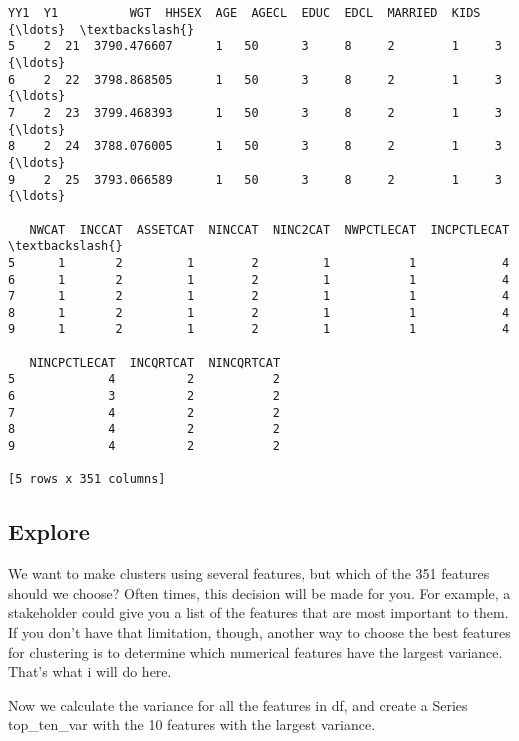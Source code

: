 \documentclass[11pt]{article}
\makeatletter
\newcommand{\boxspacing}{\kern\kvtcb@left@rule\kern\kvtcb@boxsep}
\newcommand{\prompt}[4]{
        \ttfamily\llap{{\color{#2}[#3]:\hspace{3pt}#4}}\vspace{-\baselineskip}
    }
\makeatother
\begin{document}
            \begin{tcolorbox}[breakable, size=fbox, boxrule=.5pt, pad at break*=1mm, opacityfill=0]
\prompt{Out}{outcolor}{4}{\boxspacing}
\begin{Verbatim}[commandchars=\\\{\}]
   YY1  Y1          WGT  HHSEX  AGE  AGECL  EDUC  EDCL  MARRIED  KIDS  {\ldots}  \textbackslash{}
5    2  21  3790.476607      1   50      3     8     2        1     3  {\ldots}
6    2  22  3798.868505      1   50      3     8     2        1     3  {\ldots}
7    2  23  3799.468393      1   50      3     8     2        1     3  {\ldots}
8    2  24  3788.076005      1   50      3     8     2        1     3  {\ldots}
9    2  25  3793.066589      1   50      3     8     2        1     3  {\ldots}

   NWCAT  INCCAT  ASSETCAT  NINCCAT  NINC2CAT  NWPCTLECAT  INCPCTLECAT  \textbackslash{}
5      1       2         1        2         1           1            4
6      1       2         1        2         1           1            4
7      1       2         1        2         1           1            4
8      1       2         1        2         1           1            4
9      1       2         1        2         1           1            4

   NINCPCTLECAT  INCQRTCAT  NINCQRTCAT
5             4          2           2
6             3          2           2
7             4          2           2
8             4          2           2
9             4          2           2

[5 rows x 351 columns]
\end{Verbatim}
\end{tcolorbox}
        
    \hypertarget{explore}{%
\subsection{Explore}\label{explore}}

    We want to make clusters using several features, but which of the 351
features should we choose? Often times, this decision will be made for
you. For example, a stakeholder could give you a list of the features
that are most important to them. If you don't have that limitation,
though, another way to choose the best features for clustering is to
determine which numerical features have the largest variance. That's
what i will do here.

    Now we calculate the variance for all the features in df, and create a
Series top\_ten\_var with the 10 features with the largest variance.
\end{document}
